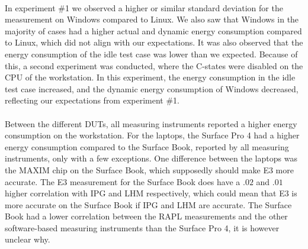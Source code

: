 
\paragraph*{}
In experiment \#1 we observed a higher or similar standard deviation for the measurement on Windows compared to Linux. We also saw that Windows in the majority of cases had a higher actual and dynamic energy consumption compared to Linux, which did not align with our expectations. It was also observed that the energy consumption of the idle test case was lower than we expected. Because of this, a second experiment was conducted, where the C-states were disabled on the CPU of the workstation. In this experiment, the energy consumption in the idle test case increased, and the dynamic energy consumption of Windows decreased, reflecting our expectations from experiment \#1.

\paragraph*{}
Between the different DUTs, all measuring instruments reported a higher energy consumption on the workstation. For the laptops, the Surface Pro 4 had a higher energy consumption compared to the Surface Book, reported by all measuring instruments, only with a few exceptions. One difference between the laptops was the MAXIM chip on the Surface Book, which supposedly should make E3 more accurate. The E3 measurement for the Surface Book does have a $.02$ and $.01$ higher correlation with IPG and LHM respectively, which could mean that E3 is more accurate on the Surface Book if IPG and LHM are accurate. The Surface Book had a lower correlation between the RAPL measurements and the other software-based measuring instruments than the Surface Pro 4, it is however unclear why.

